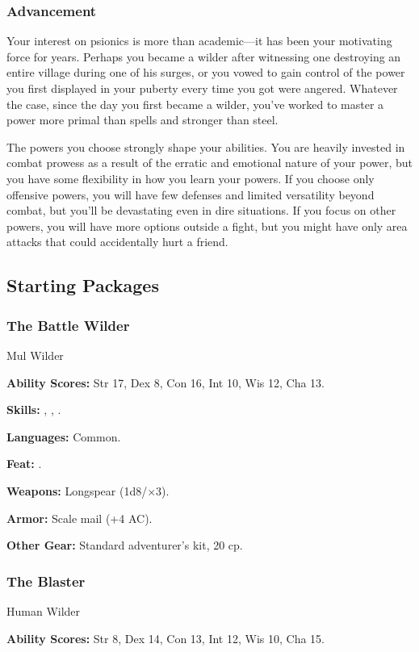 \subsubsection{Advancement}
Your interest on psionics is more than academic---it has been your motivating force for years. Perhaps you became a wilder after witnessing one destroying an entire village during one of his surges, or you vowed to gain control of the power you first displayed in your puberty every time you got were angered. Whatever the case, since the day you first became a wilder, you've worked to master a power more primal than spells and stronger than steel.

The powers you choose strongly shape your abilities. You are heavily invested in combat prowess as a result of the erratic and emotional nature of your power, but you have some flexibility in how you learn your powers. If you choose only offensive powers, you will have few defenses and limited versatility beyond combat, but you'll be devastating even in dire situations. If you focus on other powers, you will have more options outside a fight, but you might have only area attacks that could accidentally hurt a friend.

\subsection{Starting Packages}
\subsubsection{The Battle Wilder}
Mul Wilder

\textbf{Ability Scores:} Str 17, Dex 8, Con 16, Int 10, Wis 12, Cha 13.

\textbf{Skills:} , , .

\textbf{Languages:} Common.

\textbf{Feat:} .

\textbf{Weapons:} Longspear (1d8/$\times$3).

\textbf{Armor:} Scale mail (+4 AC).

\textbf{Other Gear:} Standard adventurer's kit, 20 cp.

\subsubsection{The Blaster}
Human Wilder

\textbf{Ability Scores:} Str 8, Dex 14, Con 13, Int 12, Wis 10, Cha 15.

